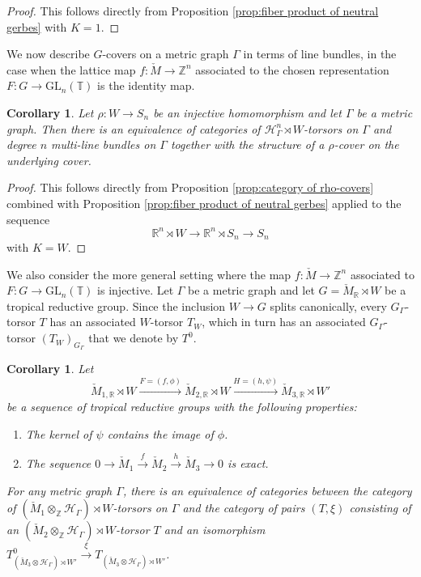 \documentclass[10pt, a4paper]{amsart}
\newtheorem{corollary}[theorem]{Corollary}
\theoremstyle{definition}
\theoremstyle{myitemstyle}
\newcommand{\R}{\mathbb{R}}
\newcommand{\ZZ}{\mathbb{Z}}
\newcommand{\RR}{\mathbb{R}}
\newcommand{\TT}{\mathbb{T}}
\newcommand{\Mcheck}{{\check{M}}}
\newcommand{\mc}[1]{{\mathcal{#1}}}
\newcommand{\GL}{{\mathrm{GL}}}
\newcommand{\Ga}{\Gamma}
\begin{document}
\begin{proof}
    This follows directly from Proposition \ref{prop:fiber product of neutral gerbes} with $K=1$.
\end{proof}

We now describe $G$-covers on a metric graph $\Ga$ in terms of line bundles, in the case when the lattice map $f:\Mcheck \to \ZZ^n$ associated to the chosen representation $F:G\to \GL_n(\TT)$ is the identity map.

\begin{corollary}
\label{cor:torsors as multi-line bundles with rho-structure}
    Let $\rho:W\to S_n$ be an injective homomorphism and let $\Gamma$ be a metric graph. Then  there is an equivalence of categories of $ \mc H_\Gamma^n \rtimes W$-torsors on $\Gamma$ and degree $n$ multi-line bundles on $\Gamma$ together with the structure of a $\rho$-cover on the underlying cover.
\end{corollary}

\begin{proof}
    This follows directly from Proposition \ref{prop:category of rho-covers} combined with Proposition \ref{prop:fiber product of neutral gerbes} applied to the sequence
    \[
     \R^n \rtimes W \to 
        \R^n \rtimes S_n\to 
            S_n 
    \]
    with $K=W$.
\end{proof}

We also consider the more general setting where the map $f:\Mcheck\to \ZZ^n$ associated to $F:G\to \GL_n(\TT)$ is injective. Let $\Gamma$ be a metric graph and let $G=\Mcheck_{\RR}\rtimes W$ be a tropical reductive group. Since the inclusion $W\to G$ splits canonically, every $G_\Gamma$-torsor $T$ has an associated $W$-torsor $T_W$, which in turn has an associated $G_\Ga$-torsor $(T_W)_{G_\Gamma}$ that we denote by $T^0$.



\begin{corollary}
\label{cor:exact sequence on lattices}
    Let
    \[ 
        \Mcheck_{1,\RR}\rtimes W \xrightarrow{F=(f,\phi)}
            \Mcheck_{2,\RR}\rtimes W\xrightarrow{H=(h,\psi)}
                \Mcheck_{3,\RR}\rtimes W' 
    \]
    be a sequence of tropical reductive groups with the following properties:
    \begin{enumerate}
        \item The kernel of $\psi$ contains the image of $\phi$. 
        \item The sequence $0\to \Mcheck_1\xrightarrow{f} \Mcheck_2\xrightarrow{h} \Mcheck_3\to 0$ is exact.
    \end{enumerate}
For any metric graph $\Gamma$, there is an equivalence of categories between the category of $(\Mcheck_1\otimes_{\ZZ} \mc H_\Gamma)\rtimes W$-torsors on $\Gamma$ and the category of pairs $(T,\xi)$ consisting of an $(\Mcheck_2\otimes_{\ZZ} \mc H_\Gamma) \rtimes W$-torsor $T$ and an isomorphism $T_{(\Mcheck_3\otimes \mc H_\Gamma)\rtimes W'}^0\xrightarrow{\xi }T_{(\Mcheck_3\otimes \mc H_\Gamma)\rtimes W'}$.
\end{corollary}
\end{document}
